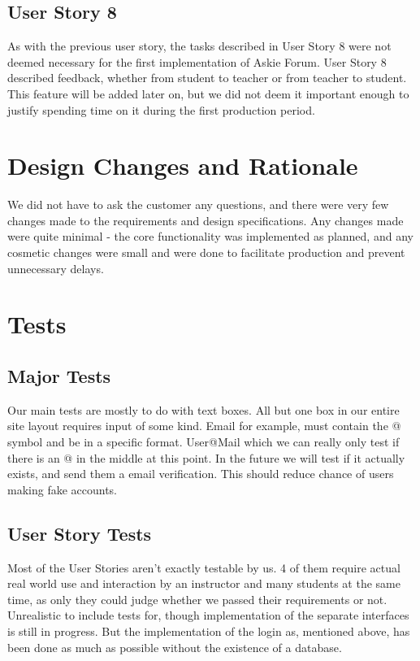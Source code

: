\documentclass[12pt]{article}
\begin{document}
\subsection{User Story 8}

\begin{flushleft}
As with the previous user story, the tasks described in User Story 8 were not deemed necessary for the first implementation of Askie Forum. User Story 8 described feedback, whether from student to teacher or from teacher to student. This feature will be added later on, but we did not deem it important enough to justify spending time on it during the first production period.
\end{flushleft}

\section{Design Changes and Rationale}
\begin{flushleft}
We did not have to ask the customer any questions, and there were very few changes made to the requirements and design specifications. Any changes made were quite minimal - the core functionality was implemented as planned, and any cosmetic changes were small and were done to facilitate production and prevent unnecessary delays.
\end{flushleft}

\section{Tests}
\subsection{Major Tests}
\begin{flushleft}
Our main tests are mostly to do with text boxes.  All but one box in our entire site layout requires input of some kind.  Email for example, must contain the @ symbol and be in a specific format. User@Mail which we can really only test if there is an @ in the middle at this point.  In the future we will test if it actually exists, and send them a email verification.  This should reduce chance of users making fake accounts.
\end{flushleft}

\subsection{User Story Tests}
\begin{flushleft}
Most of the User Stories aren't exactly testable by us. 4 of them require actual real world use and interaction by an instructor and many students at the same time, as only they could judge whether we passed their requirements or not. Unrealistic to include tests for, though implementation of the separate interfaces is still in progress.  But the implementation of the login as, mentioned above, has been done as much as possible without the existence of a database.
\end{flushleft}
\end{document}

